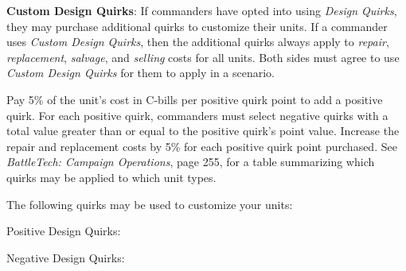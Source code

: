 \item {\bfseries Custom Design Quirks}: If commanders have opted into using \emph{Design Quirks}, they may purchase additional quirks to customize their units.
If a commander uses \emph{Custom Design Quirks}, then the additional quirks always apply to \emph{repair}, \emph{replacement}, \emph{salvage}, and \emph{selling} costs for all units.
Both sides must agree to use \emph{Custom Design Quirks} for them to apply in a scenario.

Pay 5\% of the unit's cost in C-bills per positive quirk point to add a positive quirk.
For each positive quirk, commanders must select negative quirks with a total value greater than or equal to the positive quirk's point value.
Increase the repair and replacement costs by 5\% for each positive quirk point purchased.
See \emph{BattleTech: Campaign Operations}, page 255, for a table summarizing which quirks may be applied to which unit types.

The following quirks may be used to customize your units:

Positive Design Quirks:



Negative Design Quirks:


